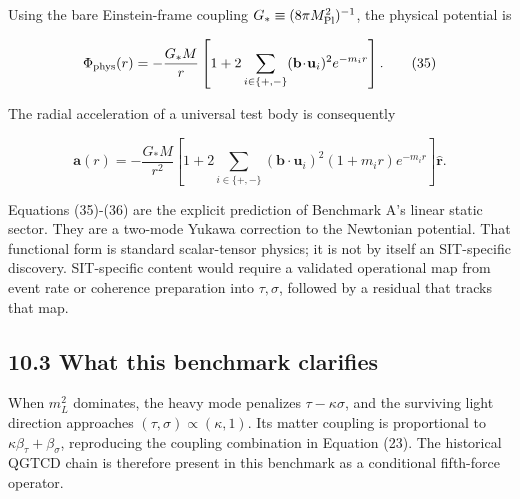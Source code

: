 \documentclass[
  american,
  11pt,
  letterpaper,
]{article}
\begin{document}
Using the bare Einstein-frame coupling \(G_*\equiv(8\pi M_{\rm Pl}^2)^{-1}\), the physical potential is

\begin{equation}
\Phi_{\rm phys}(r)=
-\frac{G_*M}{r}\left[
1+2\sum_{i\in\{+,-\}}
(\mathbf b\!\cdot\!\mathbf u_i)^2e^{-m_ir}
\right].
\tag{35}
\end{equation}

The radial acceleration of a universal test body is consequently

\begin{equation}
\mathbf a(r)=
-\frac{G_*M}{r^2}\left[
1+2\sum_{i\in\{+,-\}}
(\mathbf b\!\cdot\!\mathbf u_i)^2
(1+m_ir)e^{-m_ir}
\right]\hat{\mathbf r}.
\tag{36}
\end{equation}

Equations (35)-(36) are the explicit prediction of Benchmark A's linear static sector. They are a two-mode Yukawa correction to the Newtonian potential. That functional form is standard scalar-tensor physics; it is not by itself an SIT-specific discovery. SIT-specific content would require a validated operational map from event rate or coherence preparation into \(\tau,\sigma\), followed by a residual that tracks that map.

\subsection{10.3 What this benchmark clarifies}\label{what-this-benchmark-clarifies}

When \(m_L^2\) dominates, the heavy mode penalizes \(\tau-\kappa\sigma\), and the surviving light direction approaches \((\tau,\sigma)\propto(\kappa,1)\). Its matter coupling is proportional to \(\kappa\beta_\tau+\beta_\sigma\), reproducing the coupling combination in Equation (23). The historical QGTCD chain is therefore present in this benchmark as a conditional fifth-force operator.
\end{document}
